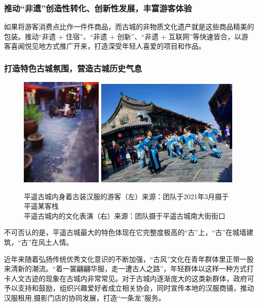 \documentclass[UTF8]{ctexart}
\begin{document}
        \subsubsection{推动“非遗”创造性转化、创新性发展，丰富游客体验}

如果将游客消费点比作一件件商品，而古城的非物质文化遗产就是这些商品精美的包装。推动“非遗 + 住宿”、“非遗 + 创新”、“非遗 + 互联网”等快速皆合，以游客喜闻悦见地方式推广开来，打造深受年轻人喜爱的项目和作品。

        \subsubsection{打造特色古城氛围，营造古城历史气息}
\begin{figure}[H]
    \centering
    \includegraphics[width=4cm]{汉服.jpeg}
    \includegraphics[width=7cm]{表演.jpg}
    \caption{平遥古城内身着古装汉服的游客（左）来源：团队于2021年3月摄于平遥某客栈\\平遥古城内的文化表演（右）来源：团队摄于平遥古城南大街街口}
    \label{fig:my_label}
\end{figure}
不可否认的是，平遥古城最大的特色体现在它完整度极高的“古”上，“古”在城墙建筑，“古”在风土人情。

近年来随着弘扬传统优秀文化意识的不断加强，“古风”文化在青年群体里正带一股来清新的潮流。“着一裳翩翩华服，走一遭古人之路”，年轻群体以这样一种方式打卡人文古迹的现象在古城内非常常见。对于古城内逐渐庞大的这类新群体，政府可予以支持和鼓励，组织兴趣爱好者成立相关协会，同时宣传本地的汉服商铺，推动汉服租用,摄影门店的协同发展，打造“一条龙”服务。
\end{document}
